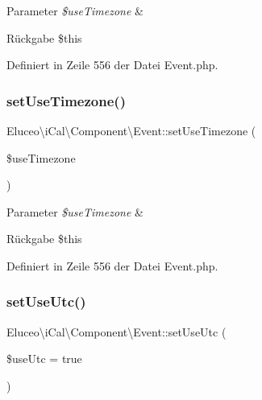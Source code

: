 \begin{DoxyParams}{Parameter}
{\em \$use\+Timezone} & \\
\hline
\end{DoxyParams}
\begin{DoxyReturn}{Rückgabe}
\$this 
\end{DoxyReturn}


Definiert in Zeile 556 der Datei Event.\+php.

\mbox{\label{class_eluceo_1_1i_cal_1_1_component_1_1_event_a73e24367751af65fcda2366c9df77409}} 
\subsubsection{\texorpdfstring{set\+Use\+Timezone()}{setUseTimezone()}\hspace{0.1cm}{\footnotesize\ttfamily [3/3]}}
{\footnotesize\ttfamily Eluceo\textbackslash{}i\+Cal\textbackslash{}\+Component\textbackslash{}\+Event\+::set\+Use\+Timezone (\begin{DoxyParamCaption}\item[{}]{\$use\+Timezone }\end{DoxyParamCaption})}


\begin{DoxyParams}{Parameter}
{\em \$use\+Timezone} & \\
\hline
\end{DoxyParams}
\begin{DoxyReturn}{Rückgabe}
\$this 
\end{DoxyReturn}


Definiert in Zeile 556 der Datei Event.\+php.

\mbox{\label{class_eluceo_1_1i_cal_1_1_component_1_1_event_ad086e385a56e162445e662ccce2715b9}} 
\subsubsection{\texorpdfstring{set\+Use\+Utc()}{setUseUtc()}\hspace{0.1cm}{\footnotesize\ttfamily [1/3]}}
{\footnotesize\ttfamily Eluceo\textbackslash{}i\+Cal\textbackslash{}\+Component\textbackslash{}\+Event\+::set\+Use\+Utc (\begin{DoxyParamCaption}\item[{}]{\$use\+Utc = {\ttfamily true} }\end{DoxyParamCaption})}


